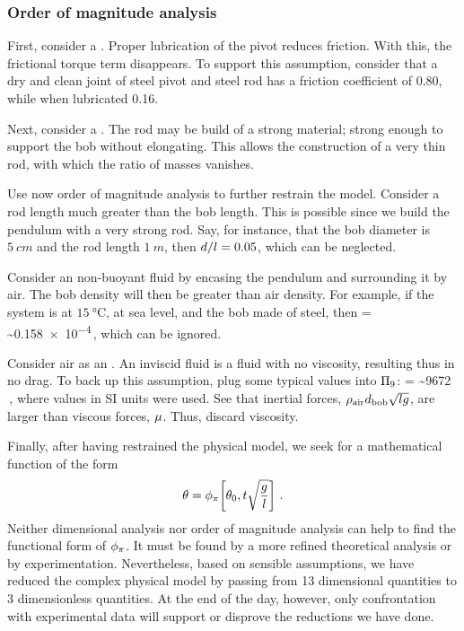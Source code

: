 \subsubsection{Order of magnitude analysis}
First, consider a . Proper lubrication of the pivot reduces friction. With this, the frictional torque term disappears. To support this assumption, consider that a dry and clean joint of steel pivot and steel rod has a friction coefficient of 0.80, while when lubricated 0.16.

Next, consider a . The rod may be build of a strong material; strong enough to support the bob without elongating. This allows the construction of a very thin rod, with which the ratio of masses vanishes.

Use now order of magnitude analysis to further restrain the model. Consider a rod length much greater than the bob length. This is possible since we build the pendulum with a very strong rod. Say, for instance, that the bob diameter is $\SI{5}{cm}$ and the rod length $\SI{1}{m}$, then $d/l = 0.05$, which can be neglected.

Consider an non-buoyant fluid by encasing the pendulum and surrounding it by air. The bob density will then be greater than air density. For example, if the system is at $\SI{15}{\celsius}$, at sea level, and the bob made of steel, then 
\beq
{} =  
                                         \sim \num{0.158e-4}\,, 
\eeq
which can be ignored.

Consider air as an . An inviscid fluid is a fluid with no viscosity, resulting thus in no drag. To back up this assumption, plug some typical values into $\Pi_9$:
\beq
{}
= 
\sim \num{9672} \,,
\eeq
where values in SI units were used. See that inertial forces, $\rho_\text{air}d_\text{bob}\sqrt{lg}$, are larger than viscous forces, $\mu$. Thus, discard viscosity.

Finally, after having restrained the physical model, we seek for a mathematical function of the form
\begin{equation}\label{eq:simplegravpendulumdimanalysis}
\theta = \phi_{\pi}\!\left[{
            \theta_0, 
            t\sqrt{\dfrac{g}{l}}
            }\right]\,.
\end{equation}
Neither dimensional analysis nor order of magnitude analysis can help to find the functional form of $\phi_{\pi}$. It must be found by a more refined theoretical analysis or by experimentation. Nevertheless, based on sensible assumptions, we have reduced the complex physical model by passing from 13 dimensional quantities to 3 dimensionless quantities. At the end of the day, however, only confrontation with experimental data will support or disprove the reductions we have done.


